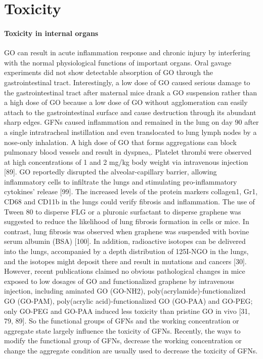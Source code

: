 \documentclass[twoside,twocolumn,9pt]{article}
\begin{document}
\section{Toxicity}
\paragraph{Toxicity in internal organs}
GO can result in acute inflammation response and chronic injury by interfering with the normal physiological functions of important organs. Oral gavage experiments did not show detectable absorption of GO through the gastrointestinal tract. Interestingly, a low dose of GO caused serious damage to the gastrointestinal tract after maternal mice drank a GO suspension rather than a high dose of GO because a low dose of GO without agglomeration can easily attach to the gastrointestinal surface and cause destruction through its abundant sharp edges. GFNs caused inflammation and remained in the lung on day 90 after a single intratracheal instillation and even translocated to lung lymph nodes by a nose-only inhalation. A high dose of GO that forms aggregations can block pulmonary blood vessels and result in dyspnea,. Platelet thrombi were observed at high concentrations of 1 and 2 mg/kg body weight via intravenous injection [89]. GO reportedly disrupted the alveolar-capillary barrier, allowing inflammatory cells to infiltrate the lungs and stimulating pro-inflammatory cytokines' release [99]. The increased levels of the protein markers collagen1, Gr1, CD68 and CD11b in the lungs could verify fibrosis and inflammation. The use of Tween 80 to disperse FLG or a pluronic surfactant to disperse graphene was suggested to reduce the likelihood of lung fibrosis formation in cells or mice. In contrast, lung fibrosis was observed when graphene was suspended with bovine serum albumin (BSA) [100]. In addition, radioactive isotopes can be delivered into the lungs, accompanied by a depth distribution of 125I-NGO in the lungs, and the isotopes might deposit there and result in mutations and cancers [30]. However, recent publications claimed no obvious pathological changes in mice exposed to low dosages of GO and functionalized graphene by intravenous injection, including aminated GO (GO-NH2), poly(acrylamide)-functionalized GO (GO-PAM), poly(acrylic acid)-functionalized GO (GO-PAA) and GO-PEG; only GO-PEG and GO-PAA induced less toxicity than pristine GO in vivo [31, 79, 89]. So the functional groups of GFNs and the working concentration or aggregate state largely influence the toxicity of GFNs. Recently, the ways to modify the functional group of GFNs, decrease the working concentration or change the aggregate condition are usually used to decrease the toxicity of GFNs.
\end{document}
